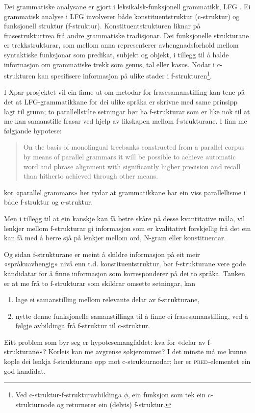 \documentclass[11pt,a4paper,oneside,draft]{report}
\newcommand{\F}[2]{\textsc{#1}\ensuremath{_{#2}}}
\newcommand{\PRED}{\F{pred}{}}
\begin{document}
Dei grammatiske analysane er gjort i leksikalsk-funksjonell
grammatikk, LFG \citep{bresnan2001lfs}. Ei grammatisk analyse i LFG
involverer både konstituentstruktur (c-struktur) og funksjonell
struktur (f-struktur). Konstituentstrukturen liknar på
frasestrukturtrea frå andre grammatiske tradisjonar. Dei funksjonelle
strukturane er trekkstrukturar, som mellom anna representerer
avhengnadsforhold mellom syntaktiske funksjonar som predikat, subjekt
og objekt, i tillegg til å halde informasjon om grammatiske trekk som
genus, tal eller kasus. Nodar i c-strukturen kan spesifisere
informasjon på ulike stader i f-strukturen\footnote{Ved c-struktur-f-strukturavbildinga $\phi$, ein funksjon som
        tek ein c-strukturnode og returnerer ein (delvis) f-struktur. }.

I Xpar-prosjektet vil ein finne ut om metodar for frasesamanstilling
kan tene på det at LFG-grammatikkane for dei ulike språka er skrivne
med same prinsipp lagt til grunn; to parallellstilte setningar bør ha
f-strukturar som er like nok til at me kan samanstille frasar ved
hjelp av likskapen mellom f-strukturane. I \citet[s.~72]{dyvik2009lmp}
finn me følgjande hypotese:

\begin{quote}
On the basis of monolingual treebanks constructed from a parallel
corpus by means of parallel grammars it will be possible to achieve
automatic word and phrase alignment with significantly higher
precision and recall than hitherto achieved through other means.
\end{quote}

kor «parallel grammars» her tydar at grammatikkane har ein viss
parallellisme i både f-struktur og c-struktur.

Men i tillegg til at ein kanskje kan få betre skåre på desse
kvantitative måla, vil lenkjer mellom f-strukturar gi informasjon som
er kvalitativt forskjellig frå det ein kan få med å berre sjå på
lenkjer mellom ord, N-gram eller konstituentar.


Og sidan f-strukturane er meint å skildre informasjon på eit meir
«språkuavhengig» nivå enn t.d. konstituentstruktur, bør f-strukturane
vere gode kandidatar for å finne informasjon som korresponderer på dei
to språka. Tanken er at me frå to f-strukturar
som skildrar omsette setningar, kan
\begin{enumerate}
\item lage ei samanstilling mellom relevante delar av f-strukturane,
\item nytte denne funksjonelle samanstillinga til å finne ei
   frasesamanstilling, ved å følgje avbildinga frå f-struktur til
   c-struktur.
\end{enumerate}
Eitt problem som byr seg er hypotesemangfaldet: kva for «delar av
f-strukturane»? Korleis kan me avgrense søkjerommet? I det minste må
me kunne kople dei lenkja f-strukturane opp mot c-strukturnodar; her
er \PRED{}-elementet ein god kandidat.
\end{document}
